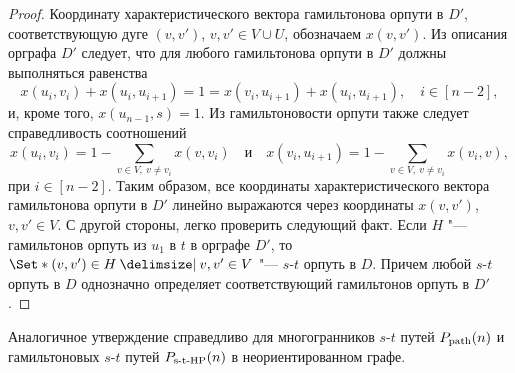 \begin{proof}
Координату характеристического вектора гамильтонова орпути в $D'$, соответствующую дуге $(v, v')$, $v, v' \in V\cup U$, обозначаем $x(v, v')$.
Из описания орграфа $D'$ следует, что для любого гамильтонова орпути в $D'$ должны выполняться равенства
\[
x(u_i, v_i) + x(u_i, u_{i+1}) = 1 = x(v_i, u_{i+1}) + x(u_i, u_{i+1}),\quad i \in [n-2],
\]
и, кроме того, $x(u_{n-1}, s) = 1$.
Из гамильтоновости орпути также следует справедливость соотношений
\[
x(u_i, v_i) = 1 - \sum_{v \in V, \ v \ne v_i} x(v, v_i)  \quad \text{и} \quad
x(v_i, u_{i+1}) = 1 - \sum_{v \in V, \ v \ne v_i} x(v_i, v),
\]
при $i \in [n-2]$.
Таким образом, все координаты характеристического вектора гамильтонова орпути в $D'$ линейно выражаются через координаты $x(v, v')$, $v,v' \in V$.
С другой стороны, легко проверить следующий факт.
Если $H$ "--- гамильтонов орпуть из $u_1$ в $t$ в орграфе $D'$, 
то $\Set*{(v,v')\in H \given v,v'\in V}$ "--- $s$-$t$ орпуть в $D$.
Причем любой $s$-$t$ орпуть в $D$ однозначно определяет соответствующий гамильтонов орпуть в $D'$.
\end{proof}

{\sloppy
Аналогичное утверждение справедливо для многогранников $s$-$t$ путей $P_{\textup{path}}(n)$
и гамильтоновых $s$-$t$ путей $P_{\textup{s-t-HP}}(n)$ в неориентированном графе.

}

